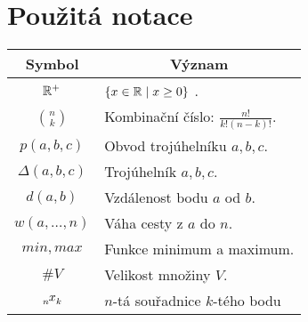 \chapter*{Použitá notace}
\label{sec:notace}
\noindent
\begin{table}[h]
  \centering
  \begin{tabular}{c l}
    Symbol             & \multicolumn{1}{c}{Význam}               \\
    \toprule
    $\mathbb{R}^+$             & $\{ x \in \mathbb{R} \mid x \geq 0 \}$ .         \\
    $ \binom{n}{k}$    & Kombinační číslo: $\frac{n!}{k!(n-k)!}$. \\
    $ p(a, b, c)$      & Obvod trojúhelníku $a, b, c$.            \\
    $\Delta(a,b,c)$    & Trojúhelník $a, b, c$.                   \\
    $ d(a, b)$         & Vzdálenost bodu $a$ od $b$.              \\
    $ w(a, \ldots, n)$ & Váha cesty z $a$ do $n$.                 \\
    $min, max$         & Funkce minimum a maximum.                \\
    $ \#V $            & Velikost množiny $V$.                    \\
    $\x{n}{k}$         & $n$-tá souřadnice $k$-tého bodu
  \end{tabular}
\end{table}